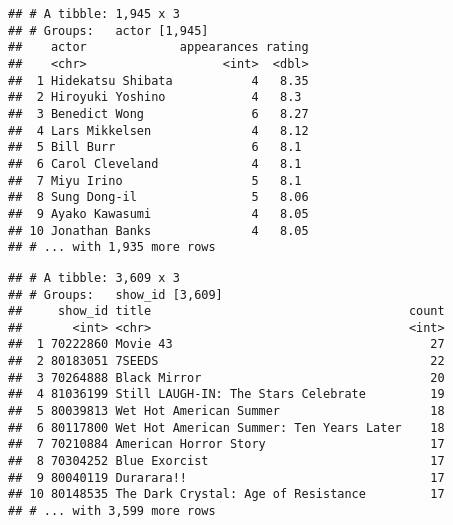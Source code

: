 \documentclass[]{article}
\newenvironment{Shaded}{\begin{snugshade}}{\end{snugshade}}
\newcommand{\DataTypeTok}[1]{\textcolor[rgb]{0.13,0.29,0.53}{#1}}
\newcommand{\DecValTok}[1]{\textcolor[rgb]{0.00,0.00,0.81}{#1}}
\newcommand{\KeywordTok}[1]{\textcolor[rgb]{0.13,0.29,0.53}{\textbf{#1}}}
\newcommand{\NormalTok}[1]{#1}
\newcommand{\OperatorTok}[1]{\textcolor[rgb]{0.81,0.36,0.00}{\textbf{#1}}}
\newcommand{\StringTok}[1]{\textcolor[rgb]{0.31,0.60,0.02}{#1}}
\begin{document}
\begin{verbatim}
## # A tibble: 1,945 x 3
## # Groups:   actor [1,945]
##    actor             appearances rating
##    <chr>                   <int>  <dbl>
##  1 Hidekatsu Shibata           4   8.35
##  2 Hiroyuki Yoshino            4   8.3 
##  3 Benedict Wong               6   8.27
##  4 Lars Mikkelsen              4   8.12
##  5 Bill Burr                   6   8.1 
##  6 Carol Cleveland             4   8.1 
##  7 Miyu Irino                  5   8.1 
##  8 Sung Dong-il                5   8.06
##  9 Ayako Kawasumi              4   8.05
## 10 Jonathan Banks              4   8.05
## # ... with 1,935 more rows
\end{verbatim}

\begin{Shaded}
\end{Shaded}

\begin{verbatim}
## # A tibble: 3,609 x 3
## # Groups:   show_id [3,609]
##     show_id title                                    count
##       <int> <chr>                                    <int>
##  1 70222860 Movie 43                                    27
##  2 80183051 7SEEDS                                      22
##  3 70264888 Black Mirror                                20
##  4 81036199 Still LAUGH-IN: The Stars Celebrate         19
##  5 80039813 Wet Hot American Summer                     18
##  6 80117800 Wet Hot American Summer: Ten Years Later    18
##  7 70210884 American Horror Story                       17
##  8 70304252 Blue Exorcist                               17
##  9 80040119 Durarara!!                                  17
## 10 80148535 The Dark Crystal: Age of Resistance         17
## # ... with 3,599 more rows
\end{verbatim}

\begin{Shaded}
\end{Shaded}
\end{document}
